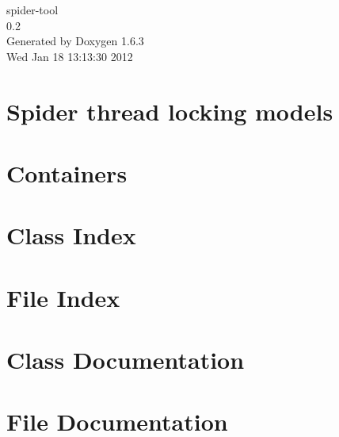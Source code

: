 \documentclass[a4paper]{book}
\begin{document}
\hypersetup{pageanchor=false}
\begin{titlepage}
\vspace*{7cm}
\begin{center}
{\Large spider-\/tool \\[1ex]\large 0.2 }\\
\vspace*{1cm}
{\large Generated by Doxygen 1.6.3}\\
\vspace*{0.5cm}
{\small Wed Jan 18 13:13:30 2012}\\
\end{center}
\end{titlepage}
\clearemptydoublepage
{}
\tableofcontents
\clearemptydoublepage
{}
\hypersetup{pageanchor=true}
\chapter{Spider thread locking models}
\label{LockDef}
\hypertarget{LockDef}{}

\chapter{Containers}
\label{obj}
\hypertarget{obj}{}

\chapter{Class Index}

\chapter{File Index}

\chapter{Class Documentation}
























\chapter{File Documentation}





\printindex
\end{document}
